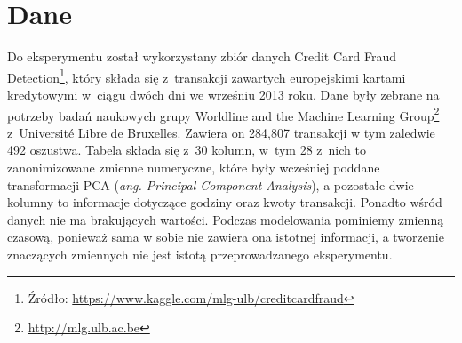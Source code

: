 \documentclass[inzynierska]{pwr_wmat_praca_dyplomowa}
\theoremstyle{plain}
\numberwithin{theorem}{chapter}
\theoremstyle{definition}
\numberwithin{theorem}{chapter}
\begin{document}
\section{Dane}
Do eksperymentu został wykorzystany zbiór danych Credit Card Fraud Detection\footnote{Źródło: \url{https://www.kaggle.com/mlg-ulb/creditcardfraud}}, który składa się z~transakcji zawartych europejskimi kartami kredytowymi w~ciągu dwóch dni we wrześniu 2013 roku. Dane były zebrane na potrzeby badań naukowych grupy Worldline and the Machine Learning Group\footnote{\url{http://mlg.ulb.ac.be}} z~Université Libre de Bruxelles. Zawiera on 284,807 transakcji w tym zaledwie 492 oszustwa. Tabela składa się z~30 kolumn, w~tym 28 z~nich to zanonimizowane zmienne numeryczne, które były wcześniej poddane transformacji PCA (\textit{ang. Principal Component Analysis}), a pozostałe dwie kolumny to informacje dotyczące godziny oraz kwoty transakcji. Ponadto wśród danych nie ma brakujących wartości. Podczas modelowania pominiemy zmienną czasową, ponieważ sama w sobie nie zawiera ona istotnej informacji, a tworzenie znaczących zmiennych nie jest istotą przeprowadzanego eksperymentu. 
\end{document}
